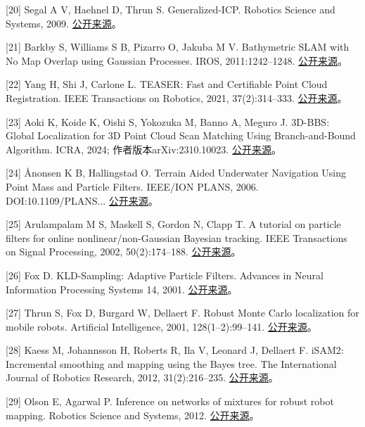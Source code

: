 {[}20{]} Segal A V, Haehnel D, Thrun S. Generalized-ICP. Robotics Science and Systems, 2009. \href{https://www.robots.ox.ac.uk/~avsegal/resources/papers/Generalized_ICP.pdf}{公开来源}。

{[}21{]} Barkby S, Williams S B, Pizarro O, Jakuba M V. Bathymetric SLAM with No Map Overlap using Gaussian Processes. IROS, 2011:1242--1248. \href{https://www-personal.acfr.usyd.edu.au/sbarkby/2011_iros_bpslam.pdf}{公开来源}。

{[}22{]} Yang H, Shi J, Carlone L. TEASER: Fast and Certifiable Point Cloud Registration. IEEE Transactions on Robotics, 2021, 37(2):314--333. \href{https://arxiv.org/abs/2001.07715}{公开来源}。

{[}23{]} Aoki K, Koide K, Oishi S, Yokozuka M, Banno A, Meguro J. 3D-BBS: Global Localization for 3D Point Cloud Scan Matching Using Branch-and-Bound Algorithm. ICRA, 2024; 作者版本arXiv:2310.10023. \href{https://arxiv.org/abs/2310.10023}{公开来源}。

{[}24{]} Ånonsen K B, Hallingstad O. Terrain Aided Underwater Navigation Using Point Mass and Particle Filters. IEEE/ION PLANS, 2006. DOI:10.1109/\allowbreak PLANS... \href{https://www.navlab.net/Publications/Terrain_Aided_Underwater_Navigation_Using_Point_Mass_And_Particle_Filters.pdf}{公开来源}。

{[}25{]} Arulampalam M S, Maskell S, Gordon N, Clapp T. A tutorial on particle filters for online nonlinear/non-Gaussian Bayesian tracking. IEEE Transactions on Signal Processing, 2002, 50(2):174--188. \href{https://doi.org/10.1109/78.978374}{公开来源}。

{[}26{]} Fox D. KLD-Sampling: Adaptive Particle Filters. Advances in Neural Information Processing Systems 14, 2001. \href{https://papers.neurips.cc/paper_files/paper/2001/hash/c5b2cebf15b205503560c4e8e6d1ea78-Abstract.html}{公开来源}。

{[}27{]} Thrun S, Fox D, Burgard W, Dellaert F. Robust Monte Carlo localization for mobile robots. Artificial Intelligence, 2001, 128(1--2):99--141. \href{https://www.borg.cc.gatech.edu/projects/monte-carlo-localization.html}{公开来源}。

{[}28{]} Kaess M, Johannsson H, Roberts R, Ila V, Leonard J, Dellaert F. iSAM2: Incremental smoothing and mapping using the Bayes tree. The International Journal of Robotics Research, 2012, 31(2):216--235. \href{https://www.borg.cc.gatech.edu/papers/kaess12ijrr.html}{公开来源}。

{[}29{]} Olson E, Agarwal P. Inference on networks of mixtures for robust robot mapping. Robotics Science and Systems, 2012. \href{https://april.eecs.umich.edu/media/pdfs/olson2012rss.pdf}{公开来源}。

